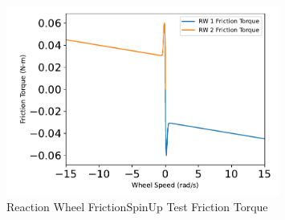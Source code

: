 \begin{figure}[htbp]\centerline{\includegraphics[width=0.8\textwidth]{AutoTeX/ReactionWheelFrictionSpinUpTestFrictionTorque}}\caption{Reaction Wheel FrictionSpinUp Test Friction Torque}\label{fig:ReactionWheelFrictionSpinUpTestFrictionTorque}\end{figure}